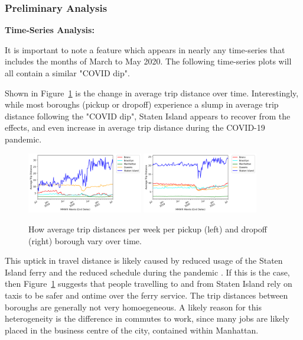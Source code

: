 \documentclass[11pt]{article}
\begin{document}
\subsubsection{Preliminary Analysis}

\textbf{Time-Series Analysis:}

It is important to note 
a feature which appears in nearly any time-series that includes 
the months of March to May 2020. 
The following time-series plots will all contain a similar "COVID dip".

Shown in Figure~\ref{fig:ts-dist-weeks} is the change in average trip distance over time. Interestingly, 
while most boroughs (pickup or dropoff) experience a slump in average trip distance following the "COVID dip", 
Staten Island appears to recover from the effects, and even increase in average trip distance
during the COVID-19 pandemic.

\begin{figure}[h]
    \includegraphics[width=0.45\textwidth]{../plots/time-series-Average Trip Distance-vs-MMWR Weeks (End Dates)-by-pu_borough.png}
    \includegraphics[width=0.45\textwidth]{../plots/time-series-Average Trip Distance-vs-MMWR Weeks (End Dates)-by-do_borough.png}
    \centering
    \caption{How average trip distances per week per pickup (left) and dropoff (right) borough vary over time.} %
    \label{fig:ts-dist-weeks}
\end{figure}

This uptick in travel distance is likely caused by reduced usage of the Staten Island ferry and the reduced schedule during the pandemic \cite{dot2020}.
If this is the case, then Figure~\ref{fig:ts-dist-weeks} suggests that people travelling to and from Staten Island rely on taxis to be safer and ontime over the ferry service.
The trip distances between boroughs are generally not very homoegeneous. 
A likely reason for this heterogeneity is the difference in commutes to work, since
many jobs are likely placed in the business centre of the city, contained within Manhattan.
\end{document}

